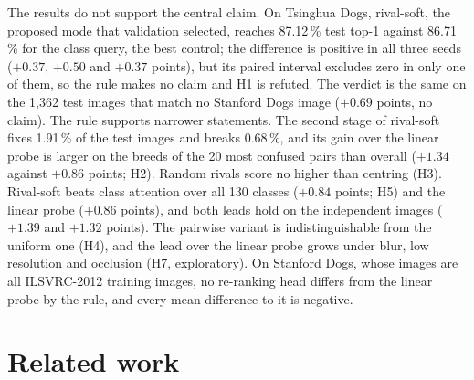 \documentclass[11pt,a4paper]{article}
\theoremstyle{plain}
\begin{document}
The results do not support the central claim. On Tsinghua Dogs, rival-soft, the proposed mode that validation
selected, reaches 87.12\,\% test top-1 against 86.71\,\% for the class query, the best control; the difference is
positive in all three seeds ($+0.37$, $+0.50$ and $+0.37$ points), but its paired interval excludes zero in only
one of them, so the rule makes no claim and H1 is refuted. The verdict is the same on the 1,362 test images that
match no Stanford Dogs image ($+0.69$ points, no claim). The rule supports narrower statements. The second stage of
rival-soft fixes 1.91\,\% of the test images and breaks 0.68\,\%, and its gain over the linear probe is larger on
the breeds of the 20 most confused pairs than overall ($+1.34$ against $+0.86$ points; H2). Random rivals score no
higher than centring (H3). Rival-soft beats class attention over all 130 classes ($+0.84$ points; H5) and the linear
probe ($+0.86$ points), and both leads hold on the independent images ($+1.39$ and $+1.32$ points). The pairwise
variant is indistinguishable from the uniform one (H4), and the lead over the linear probe grows under blur, low
resolution and occlusion (H7, exploratory). On Stanford Dogs, whose images are all ILSVRC-2012 training images, no
re-ranking head differs from the linear probe by the rule, and every mean difference to it is negative.

\section{Related work}\label{sec:related}
\end{document}
